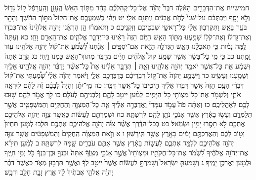 \documentclass[twoside, openany, parskip=half, 11pt]{book}
\begin{document}
חמישייח אֶֽת־הַדְּבָרִ֣ים הָאֵ֡לֶּה דִּבֶּר֩ יְהֹוָ֨ה אֶל־כׇּל־קְהַלְכֶ֜ם בָּהָ֗ר מִתּ֤וֹךְ הָאֵשׁ֙ הֶֽעָנָ֣ן וְהָֽעֲרָפֶ֔ל ק֥וֹל גָּד֖וֹל וְלֹ֣א יָסָ֑ף וַֽיִּכְתְּבֵ֗ם עַל־שְׁנֵי֙ לֻחֹ֣ת אֲבָנִ֔ים וַֽיִּתְּנֵ֖ם אֵלָֽי׃ יט וַיְהִ֗י כְּשׇׁמְעֲכֶ֤ם אֶת־הַקּוֹל֙ מִתּ֣וֹךְ הַחֹ֔שֶׁךְ וְהָהָ֖ר בֹּעֵ֣ר בָּאֵ֑שׁ וַתִּקְרְב֣וּן אֵלַ֔י כׇּל־רָאשֵׁ֥י שִׁבְטֵיכֶ֖ם וְזִקְנֵיכֶֽם׃ כ וַתֹּאמְר֗וּ הֵ֣ן הֶרְאָ֜נוּ יְהֹוָ֤ה אֱלֹהֵ֙ינוּ֙ אֶת־כְּבֹד֣וֹ וְאֶת־גׇּדְל֔וֹ וְאֶת־קֹל֥וֹ שָׁמַ֖עְנוּ מִתּ֣וֹךְ הָאֵ֑שׁ הַיּ֤וֹם הַזֶּה֙ רָאִ֔ינוּ כִּֽי־יְדַבֵּ֧ר אֱלֹהִ֛ים אֶת־הָֽאָדָ֖ם וָחָֽי׃ כא וְעַתָּה֙ לָ֣מָּה נָמ֔וּת כִּ֣י תֹֽאכְלֵ֔נוּ הָאֵ֥שׁ הַגְּדֹלָ֖ה הַזֹּ֑את אִם־יֹסְפִ֣ים ׀ אֲנַ֗חְנוּ לִ֠שְׁמֹ֠עַ אֶת־ק֨וֹל יְהֹוָ֧ה אֱלֹהֵ֛ינוּ ע֖וֹד וָמָֽתְנוּ׃ כב כִּ֣י מִ֣י כׇל־בָּשָׂ֡ר אֲשֶׁ֣ר שָׁמַ֣ע קוֹל֩ אֱלֹהִ֨ים חַיִּ֜ים מְדַבֵּ֧ר מִתּוֹךְ־הָאֵ֛שׁ כָּמֹ֖נוּ וַיֶּֽחִי׃ כג קְרַ֤ב אַתָּה֙ וּֽשְׁמָ֔ע אֵ֛ת כׇּל־אֲשֶׁ֥ר יֹאמַ֖ר יְהֹוָ֣ה אֱלֹהֵ֑ינוּ וְאַ֣תְּ ׀ תְּדַבֵּ֣ר אֵלֵ֗ינוּ אֵת֩ כׇּל־אֲשֶׁ֨ר יְדַבֵּ֜ר יְהֹוָ֧ה אֱלֹהֵ֛ינוּ אֵלֶ֖יךָ וְשָׁמַ֥עְנוּ וְעָשִֽׂינוּ׃ כד וַיִּשְׁמַ֤ע יְהֹוָה֙ אֶת־ק֣וֹל דִּבְרֵיכֶ֔ם בְּדַבֶּרְכֶ֖ם אֵלָ֑י וַיֹּ֨אמֶר יְהֹוָ֜ה אֵלַ֗י שָׁ֠מַ֠עְתִּי אֶת־ק֨וֹל דִּבְרֵ֜י הָעָ֤ם הַזֶּה֙ אֲשֶׁ֣ר דִּבְּר֣וּ אֵלֶ֔יךָ הֵיטִ֖יבוּ כׇּל־אֲשֶׁ֥ר דִּבֵּֽרוּ׃ כה מִֽי־יִתֵּ֡ן וְהָיָה֩ לְבָבָ֨ם זֶ֜ה לָהֶ֗ם לְיִרְאָ֥ה אֹתִ֛י וְלִשְׁמֹ֥ר אֶת־כׇּל־מִצְוֺתַ֖י כׇּל־הַיָּמִ֑ים לְמַ֨עַן יִיטַ֥ב לָהֶ֛ם וְלִבְנֵיהֶ֖ם לְעֹלָֽם׃ כו לֵ֖ךְ אֱמֹ֣ר לָהֶ֑ם שׁ֥וּבוּ לָכֶ֖ם לְאׇהֳלֵיכֶֽם׃ כז וְאַתָּ֗ה פֹּה֮ עֲמֹ֣ד עִמָּדִי֒ וַאֲדַבְּרָ֣ה אֵלֶ֗יךָ אֵ֧ת כׇּל־הַמִּצְוָ֛ה וְהַחֻקִּ֥ים וְהַמִּשְׁפָּטִ֖ים אֲשֶׁ֣ר תְּלַמְּדֵ֑ם וְעָשׂ֣וּ בָאָ֔רֶץ אֲשֶׁ֧ר אָנֹכִ֛י נֹתֵ֥ן לָהֶ֖ם לְרִשְׁתָּֽהּ׃ כח וּשְׁמַרְתֶּ֣ם לַעֲשׂ֔וֹת כַּאֲשֶׁ֥ר צִוָּ֛ה יְהֹוָ֥ה אֱלֹהֵיכֶ֖ם אֶתְכֶ֑ם לֹ֥א תָסֻ֖רוּ יָמִ֥ין וּשְׂמֹֽאל׃ כט בְּכׇל־הַדֶּ֗רֶךְ אֲשֶׁ֨ר צִוָּ֜ה יְהֹוָ֧ה אֱלֹהֵיכֶ֛ם אֶתְכֶ֖ם תֵּלֵ֑כוּ לְמַ֤עַן תִּֽחְיוּן֙ וְט֣וֹב לָכֶ֔ם וְהַאֲרַכְתֶּ֣ם יָמִ֔ים בָּאָ֖רֶץ אֲשֶׁ֥ר תִּֽירָשֽׁוּן׃ ו א וְזֹ֣את הַמִּצְוָ֗ה הַֽחֻקִּים֙ וְהַמִּשְׁפָּטִ֔ים אֲשֶׁ֥ר צִוָּ֛ה יְהֹוָ֥ה אֱלֹהֵיכֶ֖ם לְלַמֵּ֣ד אֶתְכֶ֑ם לַעֲשׂ֣וֹת בָּאָ֔רֶץ אֲשֶׁ֥ר אַתֶּ֛ם עֹבְרִ֥ים שָׁ֖מָּה לְרִשְׁתָּֽהּ׃ ב לְמַ֨עַן תִּירָ֜א אֶת־יְהֹוָ֣ה אֱלֹהֶ֗יךָ לִ֠שְׁמֹ֠ר אֶת־כׇּל־חֻקֹּתָ֣יו וּמִצְוֺתָיו֮ אֲשֶׁ֣ר אָנֹכִ֣י מְצַוֶּ֒ךָ֒ אַתָּה֙ וּבִנְךָ֣ וּבֶן־בִּנְךָ֔ כֹּ֖ל יְמֵ֣י חַיֶּ֑יךָ וּלְמַ֖עַן יַאֲרִכֻ֥ן יָמֶֽיךָ׃ ג וְשָׁמַעְתָּ֤ יִשְׂרָאֵל֙ וְשָׁמַרְתָּ֣ לַעֲשׂ֔וֹת אֲשֶׁר֙ יִיטַ֣ב לְךָ֔ וַאֲשֶׁ֥ר תִּרְבּ֖וּן מְאֹ֑ד כַּאֲשֶׁר֩ דִּבֶּ֨ר יְהֹוָ֜ה אֱלֹהֵ֤י אֲבֹתֶ֙יךָ֙ לָ֔ךְ אֶ֛רֶץ זָבַ֥ת חָלָ֖ב וּדְבָֽשׁ׃
\end{document}
